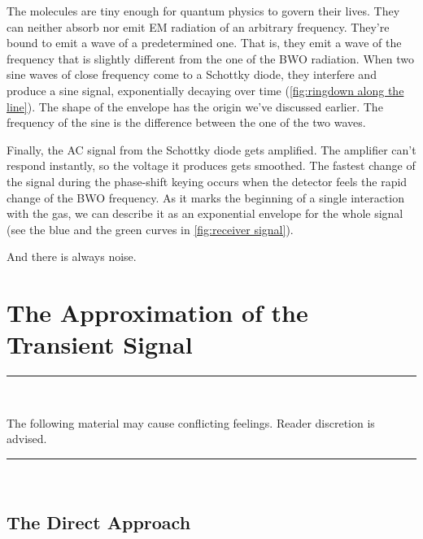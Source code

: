 \documentclass[a4paper]{article}
\begin{document}
The molecules are tiny enough for quantum physics to govern their lives. They can neither absorb nor emit EM radiation of an arbitrary frequency. They're bound to emit a wave of a predetermined one. That is, they emit a wave of the frequency that is slightly different from the one of the BWO radiation. When two sine waves of close frequency come to a Schottky diode, they interfere and produce a sine signal, exponentially decaying over time (\cref{fig:ringdown along the line}). The shape of the envelope has the origin we've discussed earlier. The frequency of the sine is the difference between the one of the two waves.

Finally, the AC signal from the Schottky diode gets amplified. The amplifier can't respond instantly, so the voltage it produces gets smoothed. The fastest change of the signal during the phase-shift keying occurs when the detector feels the rapid change of the BWO frequency. As it marks the beginning of a single interaction with the gas, we can describe it as an exponential envelope for the whole signal (see the blue and the green curves in \cref{fig:receiver signal}).

And there is always noise.

\section{The Approximation of the Transient Signal}\label{sec:The Approximation of the Transient Signal}

\begin{minipage}{\linewidth}
	\begin{center}
		\rule{0.75\linewidth}{0.2em}\\[0.5em]

		\begin{minipage}{0.75\linewidth}
			\begin{center}
				The following material may cause conflicting feelings. Reader discretion is advised.
			\end{center}
		\end{minipage}

		\rule{0.75\linewidth}{0.2em}\\[0.5em]
	\end{center}
\end{minipage}

\subsection{The Direct Approach}\label{subsec:The Direct Approach}
\end{document}
